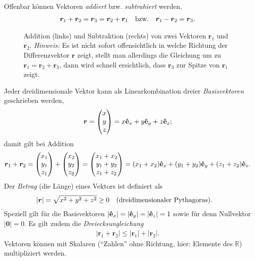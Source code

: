 Offenbar können Vektoren \emph{addiert} bzw. \emph{subtrahiert} werden, 
\begin{align}
    \bm{r}_1 + \bm{r}_2 = \bm{r}_3 = \bm{r}_2 + \bm{r}_1 \qq{bzw.} \bm{r}_1 - \bm{r}_2 = \bm{r}_3.
\end{align} 
\begin{figure}[htp]
    \centering
    \caption{Addition (links) und Subtraktion (rechts) von zwei Vektoren $\bm{r}_1$ und $\bm{r}_2$. \emph{Hinweis:} Es ist nicht sofort offensichtlich in welche Richtung der Differenzvektor $\bm{r}$ zeigt, stellt man allerdings die Gleichung um zu $\bm{r}_1 = \bm{r}_2 + \bm{r}_3$, dann wird schnell ersichtlich, dass $\bm{r}_3$ zur Spitze von $\bm{r}_1$ zeigt.}
\end{figure}

Jeder dreidimensionale Vektor kann als Linearkombination dreier \emph{Basisvektoren} geschrieben werden, 
\begin{align}
    \bm{r} = \mqty(x\\y\\z) = x \vu{e}_x + y \vu{e}_y + z \vu{e}_z;
\end{align}
damit gilt bei Addition 
\begin{align}
    \bm{r}_1 + \bm{r}_2 = \mqty(x_1\\y_1\\z_1) + \mqty(x_2\\y_2\\z_2) = \mqty(x_1+x_2\\y_1+y_2\\z_1+z_2) = (x_1+x_2)\vu{e}_x + (y_1+y_2)\vu{e}_y + (z_1+z_2)\vu{e}_z.
\end{align}
Der \emph{Betrag} (die Länge) eines Vektors ist definiert als 
\begin{align}
    |\bm{r}| = \sqrt{x^2+y^2+z^2} \ge 0 \qq{(dreidimensionaler Pythagoras).}
\end{align}
Speziell gilt für die Basisvektoren $|\vu{e}_x| = |\vu{e}_y| = |\vu{e}_z| = 1$ sowie für denn Nullvektor $|\bm{0}| = 0$. Es gilt zudem die \emph{Dreiecksungleichung}
\begin{align}
    |\bm{r}_1 + \bm{r}_2| \le |\bm{r}_1| + |\bm{r}_2|. 
\end{align} 
Vektoren können mit Skalaren (``Zahlen'' ohne Richtung, hier: Elemente des $\mathbb{R}$) multipliziert werden. 

